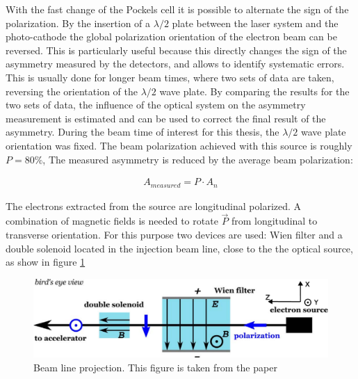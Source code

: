 With the fast change of the Pockels cell it is possible to alternate the sign of the polarization. By the insertion of a $\lambda/2$ plate between the laser system and the photo-cathode the global polarization orientation of the electron beam can be reversed. This is particularly useful because this directly changes the sign of the asymmetry measured by the detectors, and allows to identify systematic errors. This is usually done for longer beam times, where two sets of data are taken, reversing the orientation of the $\lambda/2$  wave plate. By comparing the results for the two sets of data, the influence of the optical system on the asymmetry measurement is estimated and can be used to correct the final result of the asymmetry. During the beam time of interest for this thesis, the $\lambda/2$ wave plate orientation was fixed. The beam polarization achieved with this source is roughly $P = 80 \% $, The measured asymmetry is reduced by the average beam polarization:

\begin{align*}
A_{measured} = P \cdot A_{n}
\end{align*}

The electrons extracted from the source are longitudinal polarized. A combination of magnetic fields is needed to rotate $\vec{P}$ from longitudinal to transverse orientation. For this purpose two devices are used: Wien filter and a double solenoid located in the injection beam line, close to the the optical source, as show in figure \ref{fig:Iniezione}

\begin{figure}[hbtp]
\centering
\includegraphics[width = \textwidth]{ExperimentalSetup/InjectionLine.pdf}
\caption{Beam line projection. This figure is taken from the paper \cite{Schlimme:2016rrp}}
\label{fig:Iniezione}
\end{figure}

